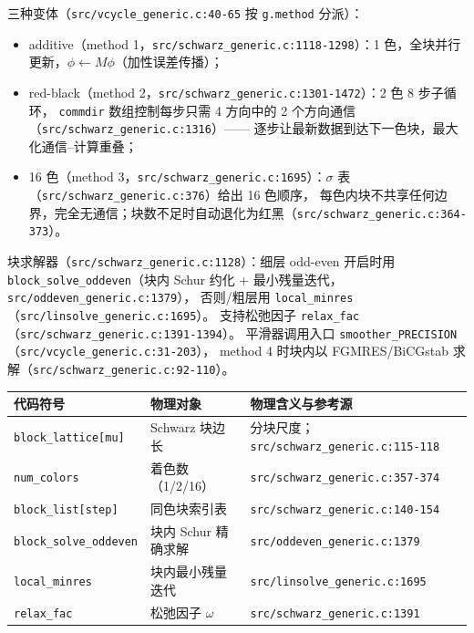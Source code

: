 \documentclass[UTF8]{ctexart}
\begin{document}
三种变体（\texttt{\nolinkurl{src/vcycle_generic.c:40-65}} 按 \texttt{g.method} 分派）：
\begin{itemize}
\item additive（method 1，\texttt{\nolinkurl{src/schwarz_generic.c:1118-1298}}）：1 色，全块并行更新，$\phi\gets M \phi$（加性误差传播）；
\item red-black（method 2，\texttt{\nolinkurl{src/schwarz_generic.c:1301-1472}}）：2 色 8 步子循环，
      \texttt{commdir} 数组控制每步只需 4 方向中的 2 个方向通信（\texttt{\nolinkurl{src/schwarz_generic.c:1316}}）——
      逐步让最新数据到达下一色块，最大化通信--计算重叠；
\item 16 色（method 3，\texttt{\nolinkurl{src/schwarz_generic.c:1695}}）：$\sigma$ 表（\texttt{\nolinkurl{src/schwarz_generic.c:376}}）给出 16 色顺序，
      每色内块不共享任何边界，完全无通信；块数不足时自动退化为红黑（\texttt{\nolinkurl{src/schwarz_generic.c:364-373}}）。
\end{itemize}
块求解器（\texttt{\nolinkurl{src/schwarz_generic.c:1128}}）：细层 odd-even 开启时用
\texttt{block\_solve\_oddeven}（块内 Schur 约化 + 最小残量迭代，\texttt{\nolinkurl{src/oddeven_generic.c:1379}}），
否则/粗层用 \texttt{local\_minres}（\texttt{\nolinkurl{src/linsolve_generic.c:1695}}）。
支持松弛因子 \texttt{relax\_fac}（\texttt{\nolinkurl{src/schwarz_generic.c:1391-1394}}）。
平滑器调用入口 \texttt{smoother\_PRECISION}（\texttt{\nolinkurl{src/vcycle_generic.c:31-203}}），
method 4 时块内以 FGMRES/BiCGstab 求解（\texttt{\nolinkurl{src/schwarz_generic.c:92-110}}）。

\begin{xltabular}{\textwidth}{llX}
\toprule
\textcolor{map}{代码符号} & 物理对象 & 物理含义与参考源 \\
\midrule
\endhead
\texttt{block\_lattice[mu]} & Schwarz 块边长 & 分块尺度；\texttt{\nolinkurl{src/schwarz_generic.c:115-118}} \\
\texttt{num\_colors} & 着色数（1/2/16） & \texttt{\nolinkurl{src/schwarz_generic.c:357-374}} \\
\texttt{block\_list[step]} & 同色块索引表 & \texttt{\nolinkurl{src/schwarz_generic.c:140-154}} \\
\texttt{block\_solve\_oddeven} & 块内 Schur 精确求解 & \texttt{\nolinkurl{src/oddeven_generic.c:1379}} \\
\texttt{local\_minres} & 块内最小残量迭代 & \texttt{\nolinkurl{src/linsolve_generic.c:1695}} \\
\texttt{relax\_fac} & 松弛因子 $\omega$ & \texttt{\nolinkurl{src/schwarz_generic.c:1391}} \\
\bottomrule
\end{xltabular}
\end{document}
